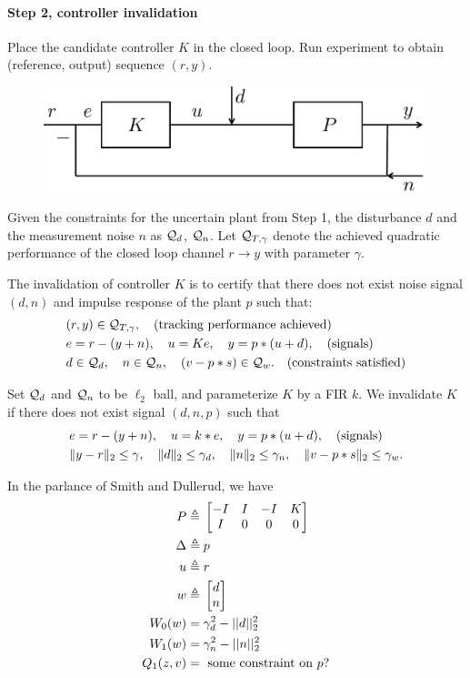 \documentclass[11pt, onecolumn]{article}
\newcommand{\qq}[1]{{\color{magenta}{(#1)}}}
\begin{document}
\paragraph{Step 2, controller invalidation}

Place the candidate controller $K$ in the closed loop. Run experiment to obtain (reference, output)
sequence $(r, y)$.
\begin{figure}[!ht]
  \centering
  \includegraphics[width=.5\linewidth]{sys2.pdf}
\end{figure}

Given the constraints for the uncertain plant from Step 1, the disturbance $d$ and the measurement
noise $n$ as $\mathcal Q_d$, $\mathcal Q_n$. Let $\mathcal Q_{T,\gamma}$ denote the achieved quadratic performance
of the closed loop channel $r\to y$ with parameter $\gamma$.

The invalidation of controller $K$ is to certify that there does not exist noise signal $(d, n)$ and
impulse response of the plant $p$ such that:
\begin{align*}
  & (r,y)\in\mathcal Q_{T,\gamma}, \quad\text{(tracking performance achieved)}
  \\
  & e = r-(y+n), \quad u = K e, \quad y = p * (u+d),  \quad\text{(signals)}
  \\
  & d\in\mathcal Q_d, \quad n\in\mathcal Q_n,  \quad (v-p*s )\in\mathcal Q_w. \quad\text{(constraints satisfied)}
\end{align*}

Set $\mathcal Q_d$ and $\mathcal Q_n$ to be $\ell_2$ ball, and parameterize $K$ by a FIR $k$.  We invalidate $K$
if there does not exist signal $(d, n, p )$ such that
\begin{align*}
  & e = r-(y+n), \quad u = k * e, \quad y = p * (u+d), \quad\text{(signals)}
  \\
  & \|y - r\|_2 \le \gamma, \quad \|d\|_2\le \gamma_d, \quad  \|n\|_2\le \gamma_n, \quad
  \|v-p*s\|_2\le \gamma_w.
\end{align*}
\qq{convex?}

In the parlance of Smith and Dullerud, we have
\begin{align*}
P \triangleq &\; \begin{bmatrix}-I & I & -I & K\\I & 0 & 0 & 0\end{bmatrix}\\
\Delta \triangleq &\; p \\
u \triangleq &\; r \\
w \triangleq &\; \begin{bmatrix}d\\n\end{bmatrix}\\
W_0(w) = &\; \gamma_d^2 - ||d||_2^2\\
W_1(w) = &\; \gamma_n^2 - ||n||_2^2\\
Q_1(z,v) = &\; \text{ some constraint on $p$?}
\end{align*}
\end{document}
